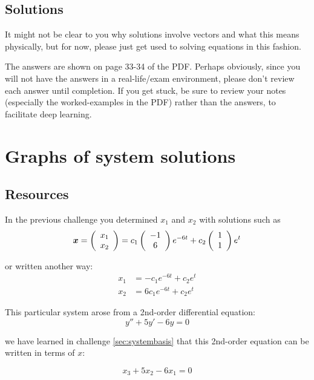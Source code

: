 \subsection*{Solutions}
It might not be clear to you why solutions involve vectors and what this means physically, but for now, please just get used to solving equations in this fashion.

The answers are shown on page 33-34 of the PDF. Perhaps obviously, since you will not have the answers in a real-life/exam environment, please don't review each answer until completion. If you get stuck, be sure to review your notes (especially the worked-examples in the PDF) rather than the answers, to facilitate deep learning. 





\newpage
\section{Graphs of system solutions}

\subsection*{Resources}
In the previous challenge you determined $x_1$ and $x_2$ with solutions such as
\begin{equation}
    \bm{x} = \left(\begin{array}{c}{x_1}\\{x_2}\end{array}\right) = c_1 \left(\begin{array}{c}{-1}\\{6}\end{array}\right) e^{-6t} + c_2 \left(\begin{array}{c}{1}\\{1}\end{array}\right) e^t
\end{equation}

or written another way:
\begin{align}
    x_1 &= -c_1 e^{-6t} + c_2 e^t \label{eqn:sysgraphx1} \\
    x_2 &= 6 c_1 e^{-6t} + c_2 e^t \label{eqn:sysgraphx2} 
\end{align}

This particular system arose from a 2nd-order differential equation:
\begin{equation}
    y'' + 5y' - 6y = 0 \label{eqn:sys2ndoode}
\end{equation}

we have learned in challenge \ref{sec:systembasis} that this 2nd-order equation can be written in terms of $x$:

\begin{equation}
    x_3 + 5x_2 - 6 x_1 = 0
\end{equation}

